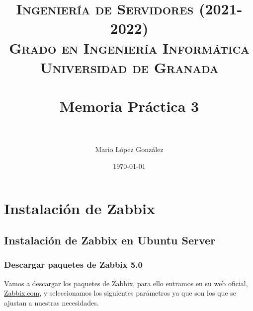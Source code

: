 

\title{	
\normalfont \normalsize 
\textsc{\textbf{Ingeniería de Servidores (2021-2022)} \\ Grado en Ingeniería Informática \\ Universidad de Granada} \\ [25pt] %
\horrule{0.5pt} \\[0.4cm] %
\huge Memoria Práctica 3 \\ %
\horrule{2pt} \\[0.5cm] %
}

\author{Mario López González} %

\date{\normalsize\today} %




\maketitle %

\newpage %

\tableofcontents %
\listoffigures %

\newpage


\section{Instalación de Zabbix}
\subsection{Instalación de Zabbix en Ubuntu Server}
\subsubsection{Descargar paquetes de Zabbix 5.0}

    Vamos a descargar los paquetes de Zabbix, para ello entramos en su web oficial, \href{https://www.zabbix.com/download}{Zabbix.com}, y 
    seleccionamos los siguientes parámetros ya que son los que se ajustan a nuestras necesidades.
        
